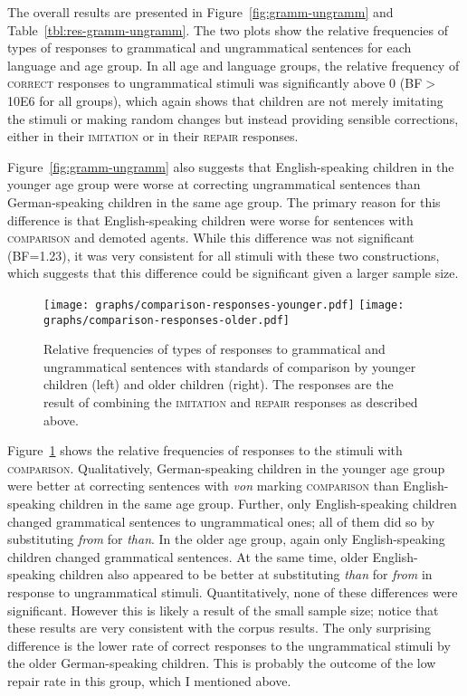 \documentclass[lucida]{sp} %
\begin{document}
The overall results are presented in Figure~\ref{fig:gramm-ungramm} and Table~\ref{tbl:res-gramm-ungramm}. The two plots show the relative frequencies of types of responses to grammatical and ungrammatical sentences for each language and age group. In all age and language groups, the relative frequency of \textsc{correct} responses to ungrammatical stimuli was significantly above 0 (BF$>$10E6 for all groups), which again shows that children are not merely imitating the stimuli or making random changes but instead providing sensible corrections, either in their \textsc{imitation} or in their \textsc{repair} responses.

Figure~\ref{fig:gramm-ungramm} also suggests that English-speaking children in the younger age group were worse at correcting ungrammatical sentences than German-speaking children in the same age group. The primary reason for this difference is that English-speaking children were worse for sentences with \textsc{comparison} and demoted agents. While this difference was not significant (BF=1.23), it was very consistent for all stimuli with these two constructions, which suggests that this difference could be significant given a larger sample size.

\begin{figure}
\texttt{[image: graphs/comparison-responses-younger.pdf]} \texttt{[image: graphs/comparison-responses-older.pdf]} 
\caption{Relative frequencies of types of responses to grammatical and ungrammatical sentences with standards of comparison by younger children (left) and older children (right). The responses are the result of combining the \textsc{imitation} and \textsc{repair} responses as described above.}\label{fig:soc-items}
\end{figure}

Figure~\ref{fig:soc-items} shows the relative frequencies of responses to the stimuli with \textsc{comparison}. Qualitatively,  German-speaking children in the younger age group were better at correcting sentences with \textit{von} marking \textsc{comparison} than English-speaking children in the same age group. Further, only English-speaking children changed grammatical sentences to ungrammatical ones; all of them did so by substituting \textit{from} for \textit{than}. In the older age group, again only English-speaking children changed grammatical sentences. At the same time, older English-speaking children also appeared to be better at substituting \textit{than} for \textit{from} in response to ungrammatical stimuli. Quantitatively, none of these differences were significant. However this is likely a result of the small sample size; notice that these results are very consistent with the corpus results. The only surprising difference is the lower rate of correct responses to the ungrammatical stimuli by the older German-speaking children. This is probably the outcome of the low repair rate in this group, which I mentioned above.
\end{document}
